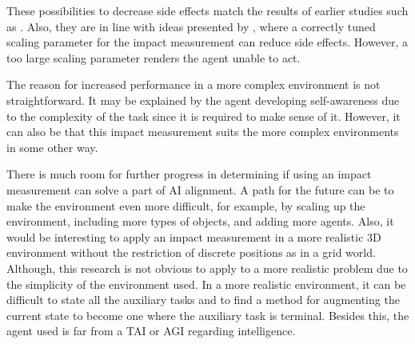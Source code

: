 \documentclass[12pt,A4]{report}
\theoremstyle{definition}
\begin{document}
These possibilities to decrease side effects match the results of earlier studies such as \citet{Turner19,Krakovna19,Krakovna20}. Also, they are in line with ideas presented by \citet{ArmstrongLevinstein}, where a correctly tuned scaling parameter for the impact measurement can reduce side effects. However, a too large scaling parameter renders the agent unable to act. 


The reason for increased performance in a more complex environment is not straightforward. It may be explained by the agent developing self-awareness due to the complexity of the task since it is required to make sense of it. However, it can also be that this impact measurement suits the more complex environments in some other way. 


There is much room for further progress in determining if using an impact measurement can solve a part of AI alignment. A path for the future can be to make the environment even more difficult, for example, by scaling up the environment, including more types of objects, and adding more agents. Also, it would be interesting to apply an impact measurement in a more realistic 3D environment without the restriction of discrete positions as in a grid world. Although, this research is not obvious to apply to a more realistic problem due to the simplicity of the environment used. In a more realistic environment, it can be difficult to state all the auxiliary tasks and to find a method for augmenting the current state to become one where the auxiliary task is terminal. Besides this, the agent used is far from a TAI or AGI regarding intelligence.
\end{document}
